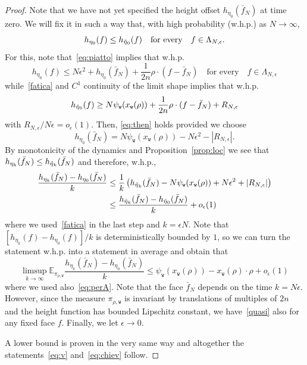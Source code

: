 \documentclass[AHL,Unicode,longabstracts,published]{cedram}
\newcommand{\ttw}{\mathtt{w}}
\newcommand{\bbE}{\mathbb{E}}
\let\oldtilde\tilde
\renewcommand*{\tilde}[1]{\mathchoice{\widetilde{#1}}{\widetilde{#1}}{\oldtilde{#1}}{\oldtilde{#1}}}
\newcommand{\ttw}{\mathtt{w}}
\begin{document}
\begin{proof}
Note that we have not yet specified the height offset $h_{\eta_0}(\bar f_N)$ at time zero. We will fix it in such a way that, with high probability (w.h.p.) as $N\to\infty$,
\begin{equation}\label{eq:then}
h_{\eta_0}(f)\le h_{\tilde \eta_0}(f) \quad \text{for every} \quad f\in \Lambda_{N,\epsilon}.
\end{equation}
For this, note that~\eqref{eq:piatto} implies that w.h.p.
\begin{equation}
h_{\eta_0}(f)\le N\epsilon^2+h_{\eta_0}(\bar f_N)+\frac1{2n}\rho\cdot(f-\bar f_N) \quad \text{for every} \quad f\in \Lambda_{N,\epsilon}
\end{equation}
while~\eqref{fatica} and $C^1$ continuity of the limit shape implies that w.h.p.
\begin{equation}
h_{\tilde \eta_0}(f)\ge N\psi_{\ttw}(x_{\ttw}(\rho))+\frac1{2n}\rho\cdot(f-\bar f_N)+R_{N,\epsilon}
\end{equation}
with $R_{N,\epsilon}/N\epsilon= o_\epsilon(1)$. Then, \eqref{eq:then} holds provided we choose
\[
h_{\eta_0}(\bar f_N)=N\psi_{\ttw}(x_{\ttw}(\rho))-N\epsilon^2-\left|R_{N,\epsilon}\right|.
\]
By monotonicity of the dynamics and Proposition~\ref{prop:loc} we see that $h_{\eta_k}(\bar f_N)\le h_{\tilde\eta_k}(\bar f_N)$ and therefore, w.h.p.,
\begin{equation}
\begin{aligned}
\frac{h_{\eta_k}(\bar f_N)-h_{\eta_0}(\bar f_N)}k&\le \frac1k\left(h_{\tilde\eta_k}(\bar f_N)-N\psi_{\ttw}(x_{\ttw}(\rho))+N\epsilon^2+\left|R_{N,\epsilon}\right|\right)
\\
&\le \frac{h_{\tilde\eta_k}(\bar f_N)- h_{\tilde\eta_0}(\bar f_N)}k+o_\epsilon(1)
\end{aligned}
\end{equation}
where we used~\eqref{fatica} in the last step and $k=\epsilon N$. Note that $[h_{\eta_k}(f)-h_{\eta_0}(f)]/k$ is deterministically bounded by $1$, so we can turn the statement w.h.p. into a statement in average and obtain that
\begin{equation}\label{quasi}
\limsup_{k\to\infty}
\bbE_{\pi_{\rho,\ttw}}\frac{h_{\eta_k}(\bar f_N)-h_{\eta_0}(\bar f_N)}k\le\psi_{\ttw}(x_{\ttw}(\rho))-x_{\ttw}(\rho)\cdot \rho+o_\epsilon(1)
\end{equation}
where we used also~\eqref{eq:perA}. Note that the face $\bar f_N$ depends on the time $k=N\epsilon$. However, since the measure $\pi_{\rho,\ttw}$ is invariant by translations of multiples of $2n$ and the height function has bounded Lipschitz constant, we have~\eqref{quasi} also for any fixed face $f$. Finally, we let $\epsilon\to0$.

A lower bound is proven in the very same way and altogether the statements~\eqref{eq:v} and~\eqref{eq:chiev} follow.
\end{proof}
\end{document}

